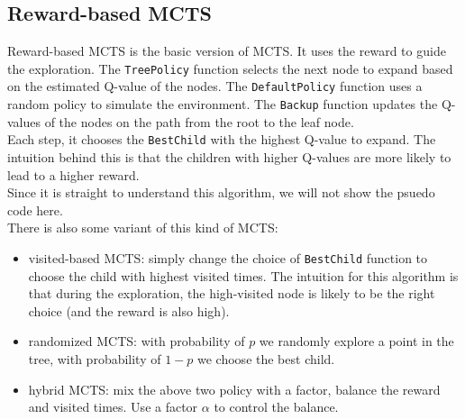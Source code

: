\documentclass[11pt]{article}
\theoremstyle{definitionstyle}
\begin{document}
\subsection{Reward-based MCTS}
Reward-based MCTS is the basic version of MCTS. It uses the reward to guide the exploration. The \texttt{TreePolicy} function selects the next node to expand based on the estimated Q-value of the nodes. The \texttt{DefaultPolicy} function uses a random policy to simulate the environment. The \texttt{Backup} function updates the Q-values of the nodes on the path from the root to the leaf node.\\
Each step, it chooses the \texttt{BestChild} with the highest Q-value to expand. The intuition behind this is that the children with higher Q-values are more likely to lead to a higher reward.\\
Since it is straight to understand this algorithm, we will not show the psuedo code here.\\
There is also some variant of this kind of MCTS:
\begin{itemize}
    \item visited-based MCTS: simply change the choice of \texttt{BestChild} function to choose the child with highest visited times. The intuition for this algorithm is that during the exploration, the high-visited node is likely to be the right choice (and the reward is also high).
    \item randomized MCTS: with probability of $p$ we randomly explore a point in the tree, with probability of $1-p$ we choose the best child.
    \item hybrid MCTS: mix the above two policy with a factor, balance the reward and visited times. Use a factor $\alpha$ to control the balance.
\end{itemize}
\end{document}
